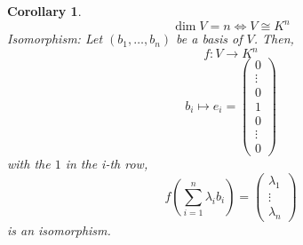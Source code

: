 \documentclass[a4paper,landscape,twocolumn]{article}
\newtheorem{cor}{Corollary}[section]
\begin{document}
\begin{cor}
  \[ \dim{V} = n \iff V \cong K^n \]
  Isomorphism: Let $(b_1, \dots, b_n)$ be a basis of $V$.
  Then,
  \[ f: V \rightarrow K^n \]
  \[ b_i \mapsto e_i = \begin{pmatrix} 0 \\ \vdots \\ 0 \\ 1 \\ 0 \\ \vdots \\ 0 \end{pmatrix} \]
  with the $1$ in the i-th row,
  \[
    f\left(\sum_{i=1}^n \lambda_i b_i\right)
    = \begin{pmatrix} \lambda_1 \\ \vdots \\ \lambda_n \end{pmatrix}
  \]
  is an isomorphism.
\end{cor}
\end{document}
